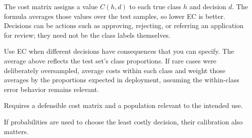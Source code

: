 The cost matrix assigns a value $C(h,d)$ to each true class $h$ and decision $d$. The formula averages those values over the test samples, so lower EC is better. Decisions can be actions such as approving, rejecting, or referring an application for review; they need not be the class labels themselves.


Use EC when different decisions have consequences that you can specify. The average above reflects the test set's class proportions. If rare cases were deliberately oversampled, average costs within each class and weight those averages by the proportions expected in deployment, assuming the within-class error behavior remains relevant.

{
\item Requires a defensible cost matrix and a population relevant to the intended use.
\item If probabilities are used to choose the least costly decision, their calibration also matters.
}

\metricsecondpage
\thispagestyle{customstyle}



